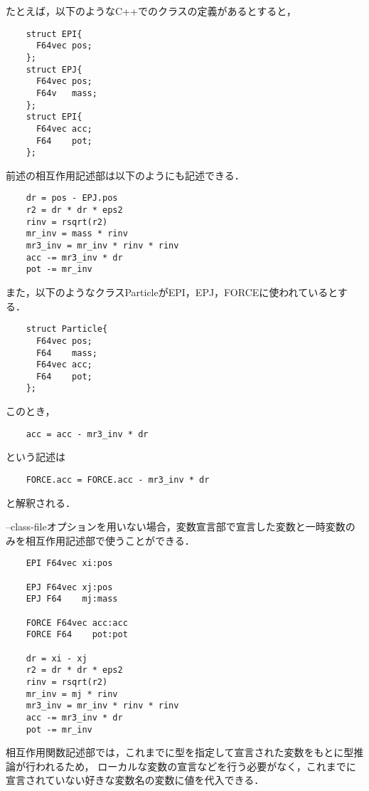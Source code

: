 \documentclass{article}
\begin{document}
たとえば，以下のようなC++でのクラスの定義があるとすると，
\begin{verbatim}
	struct EPI{
	  F64vec pos;
	};
	struct EPJ{
	  F64vec pos;
	  F64v   mass;
	};
	struct EPI{
	  F64vec acc;
	  F64    pot;
	};
\end{verbatim}
前述の相互作用記述部は以下のようにも記述できる．
\begin{verbatim}
	dr = pos - EPJ.pos
	r2 = dr * dr * eps2
	rinv = rsqrt(r2)
	mr_inv = mass * rinv
	mr3_inv = mr_inv * rinv * rinv
	acc -= mr3_inv * dr
	pot -= mr_inv
\end{verbatim}

また，以下のようなクラスParticleがEPI，EPJ，FORCEに使われているとする．
\begin{verbatim}
	struct Particle{
	  F64vec pos;
	  F64    mass;
	  F64vec acc;
	  F64    pot;
	};
\end{verbatim}
このとき，
\begin{verbatim}
	acc = acc - mr3_inv * dr
\end{verbatim}
という記述は
\begin{verbatim}
	FORCE.acc = FORCE.acc - mr3_inv * dr
\end{verbatim}
と解釈される．


--class-fileオプションを用いない場合，変数宣言部で宣言した変数と一時変数のみを相互作用記述部で使うことができる．
\begin{verbatim}
	EPI F64vec xi:pos

	EPJ F64vec xj:pos
	EPJ F64    mj:mass

	FORCE F64vec acc:acc
	FORCE F64    pot:pot

	dr = xi - xj
	r2 = dr * dr * eps2
	rinv = rsqrt(r2)
	mr_inv = mj * rinv
	mr3_inv = mr_inv * rinv * rinv
	acc -= mr3_inv * dr
	pot -= mr_inv
\end{verbatim}

相互作用関数記述部では，これまでに型を指定して宣言された変数をもとに型推論が行われるため，
ローカルな変数の宣言などを行う必要がなく，これまでに宣言されていない好きな変数名の変数に値を代入できる．
\end{document}
